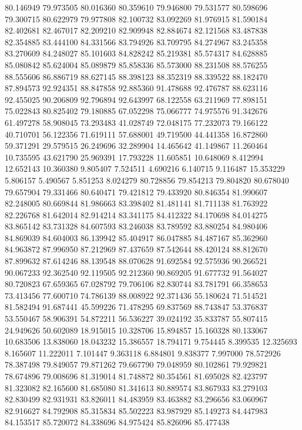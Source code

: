 80.146949
79.973505
80.016360
80.359610
79.946800
79.531577
80.598696
79.300715
80.622979
79.977808
82.100732
83.092269
81.976915
81.590184
82.402681
82.467017
82.209210
82.909948
82.884674
82.121568
83.487838
82.354885
83.444100
84.331566
83.794926
83.709795
84.274967
83.245358
83.270609
84.248027
85.101603
84.828242
85.219381
85.574317
84.628885
85.080842
85.624004
85.089879
85.858336
85.573000
88.231508
88.576255
88.555606
86.886719
88.627145
88.398123
88.352319
88.339522
88.182470
87.894573
92.924351
88.847858
92.885360
91.478688
92.476787
88.623116
92.455025
90.206809
92.796894
92.643997
68.122558
63.211969
77.898151
75.022843
80.825402
79.180885
67.052298
75.066777
74.975576
91.342676
61.497278
58.908045
73.293483
41.028749
72.048175
77.232073
79.166122
40.710701
56.122356
71.619111
57.688001
49.719500
44.441358
16.872860
59.371291
29.579515
26.249696
32.289904
14.465642
41.149867
11.260464
10.735595
43.621790
25.969391
17.793228
11.605851
10.648069
8.412994
12.652143
10.360380
9.805407
7.524511
4.690216
6.140715
9.116487
15.353229
5.806157
5.490567
5.851253
8.024279
80.728856
79.854213
79.804820
80.678040
79.657904
79.331466
80.640471
79.421812
79.433920
80.846354
81.990607
82.248005
80.669844
81.986663
83.398402
81.481141
81.711138
81.763922
82.226768
81.642014
82.914214
83.341175
84.412322
84.170698
84.014275
83.865142
83.731328
84.607593
83.246038
83.789592
83.880254
84.980406
84.869039
84.604003
86.139942
85.404917
86.047885
84.487167
85.362960
84.963872
87.996950
87.212969
87.437659
87.542644
88.420124
88.812670
87.899632
87.614246
88.139548
88.070628
91.692584
92.575936
90.266521
90.067233
92.362540
92.119505
92.212360
90.869205
91.677732
91.564027
80.720823
67.659365
67.028792
79.706106
82.830744
83.781791
66.358653
73.413456
77.600710
74.786139
88.008922
92.371436
55.180624
71.514521
81.582494
91.687441
45.599226
71.478295
69.837569
88.743847
53.376837
53.550467
58.906391
54.872211
56.536227
39.024192
35.833787
55.807415
24.949626
50.602089
18.915015
10.328706
15.894857
15.160328
80.133067
10.683506
13.838060
18.043232
15.386557
18.794171
9.754445
8.399535
12.325693
8.165607
11.222011
7.101447
9.363118
6.884801
9.838377
7.997000
78.572926
78.387498
79.849057
79.871262
79.667790
79.048959
80.102861
79.929821
78.674896
79.008696
81.319014
81.748872
80.354561
81.695028
82.423797
81.323082
82.165600
81.685080
81.341613
80.889574
83.867933
83.279103
82.830499
82.931931
83.826011
84.483959
83.463882
83.296656
83.060967
82.916627
84.792908
85.315834
85.502223
83.987929
85.149273
84.447983
84.153517
85.720072
84.338696
84.975424
85.826096
85.477438
